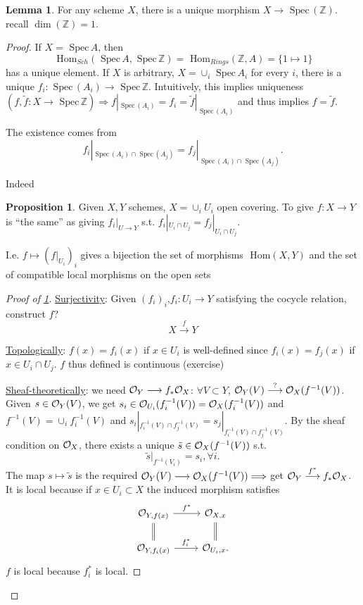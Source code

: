 \documentclass[11pt]{article}
\theoremstyle{definition}
\newtheorem{prop}[thm]{Proposition}
\newtheorem{lemma}[thm]{Lemma}
\renewcommand{\hom}{\text{ Hom}}
\newcommand{\spec}{\text{ Spec}\,}
\newcommand{\intg}{\mathbb Z}
\newcommand{\calo}{{\cal O}}
\newcommand{\Lrta}{\Longrightarrow}
\newcommand{\lrta}{\longrightarrow}
\begin{document}
\begin{lemma}
For any scheme $X$, there is a unique morphism $X\lrta \spec(\intg)$. recall $\dim(\intg)=1$.
\end{lemma}
\begin{proof}
If $X=\spec A$, then
$$
\hom_{Sch}(\spec A,\spec \intg)=\hom_{Rings}(\intg, A)=\{1\mapsto 1\}
$$
has a unique element. If $X$ is arbitrary, $X=\cup_{i}\spec A_i$ for every $i$, there is a unique $f_i:\spec (A_i)\lrta \spec \intg$. Intuitively, this implies uniqueness $(f,\tilde{f}:X\lrta \spec \intg)\Lrta f|_{\spec(A_i)}=f_i=\tilde{f}|_{\spec(A_i)}$ and thus implies $f=\tilde{f}$. 

The existence comes from
$$
f_i|_{\spec(A_i)\cap \spec(A_j)}=f_j|_{\spec(A_i)\cap \spec(A_j)}.
$$

Indeed
\begin{prop}\label{prop:morphism_of_scheme_determined_by_open_cover}
Given $X,Y$ schemes, $X=\cup_i U_i$ open covering. To give $f:X\lrta Y$ is ``the same'' as giving $f_i|_{U\lrta Y}$ s.t. $f_i|_{U_i\cap U_j}=f_j|_{U_i\cap U_j}$.

 I.e. 
$f\mapsto (f|_{U_i})_i$ gives a bijection the set of morphisms $\hom(X,Y)$ and the set of compatible local morphisms on the open sets
\end{prop}
\begin{proof}[Proof of \ref{prop:morphism_of_scheme_determined_by_open_cover}]
\underline{Surjectivity}: Given $(f_i)_i$,$ f_i:U_i\lrta Y$ satisfying the cocycle relation, construct $f$? 
$$
X\overset{f}{\lrta } Y
$$

\underline{Topologically}: $f(x)=f_i(x)$ if $x\in U_i$ is well-defined since $f_i(x)=f_j(x)$ if $x\in U_i\cap U_j$. $f$ thus defined is continuous (exercise)

\underline{Sheaf-theoretically}: we need $\calo_Y\lrta f_*\calo_X$: $\forall V\subset Y$, $\calo_Y(V)\overset{?}{\lrta}\calo_X(f^{-1}(V))$. Given $s\in \calo_Y(V)$, we get $s_i\in \calo_{U_i}(f_i^{-1}(V))=\calo_X(f_i^{-1}(V))$ and $f^{-1}(V)=\cup_i f_i^{-1}(V)$ and 
$s_i|_{f_i^{-1}(V)\cap f_j^{-1}(V)}=s_j|_{f_i^{-1}(V)\cap f_j^{-1}(V)}$. By the sheaf condition on $\calo_X$, there exists a unique $\tilde{s}\in \calo_X(f^{-1}(V))$ s.t.
$$
\tilde{s}|_{f^{-1}(V_i)}=s_i,\forall i.
$$
The map $s\mapsto \tilde{s}$ is the required
$\calo_Y(V)\lrta \calo_X(f^{-1}(V))\Lrta $ get $\calo_Y\overset{f^*}{\lrta }f_*\calo_X$. It is local because if $x\in U_i\subset X$ the induced morphism satisfies
$$
\begin{tikzcd}
{\calo_{Y,f(x)}} \arrow[r, "f^*"] \arrow[d, equal] & {\calo_{X,x}} \arrow[d, equal] \\
{\calo_{Y,f_i(x)}} \arrow[r, "f_i^*"] & {\calo_{U_i,x}}.
\end{tikzcd}
$$
$f$ is local because $f_i^*$ is local.
\end{proof}
\end{proof}
\end{document}
